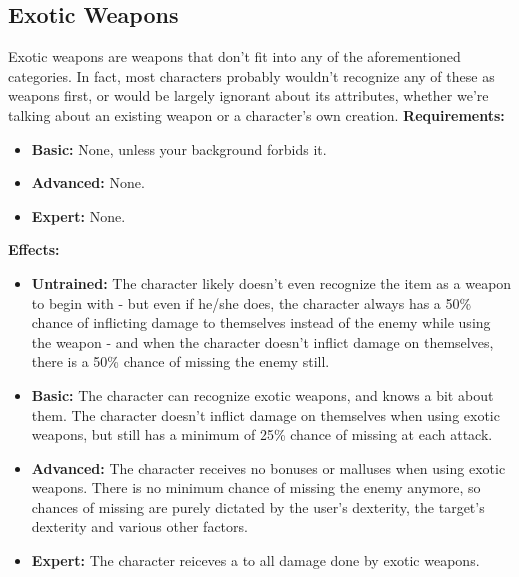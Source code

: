 \documentclass[openany,10pt,a4paper]{book}
\begin{document}
\subsection{Exotic Weapons}
\begin{table}[!ht]
\centering
{}
\end{table}
Exotic weapons are weapons that don't fit into any of the aforementioned categories. In fact, most characters probably wouldn't recognize any of these as weapons first, or would be largely ignorant about its attributes, whether we're talking about an existing weapon or a character's own creation.
\textbf{Requirements:}
\begin{itemize}
	\item \textbf{Basic:} None, unless your background forbids it.
	\item \textbf{Advanced:} None.
	\item \textbf{Expert:} None.
\end{itemize}
\textbf{Effects:}
\begin{itemize}
	\item \textbf{Untrained:} The character likely doesn't even recognize the item as a weapon to begin with - but even if he/she does, the character always has a 50\% chance of inflicting damage to themselves instead of the enemy while using the weapon - and when the character doesn't inflict damage on themselves, there is a 50\% chance of missing the enemy still.
	\item \textbf{Basic:} The character can recognize exotic weapons, and knows a bit about them. The character doesn't inflict damage on themselves when using exotic weapons, but still has a minimum of 25\% chance of missing at each attack.
	\item \textbf{Advanced:} The character receives no bonuses or malluses when using exotic weapons. There is no minimum chance of missing the enemy anymore, so chances of missing are purely dictated by the user's dexterity, the target's dexterity and various other factors.
	\item \textbf{Expert:} The character reiceves a  to all damage done by exotic weapons.
\end{itemize}\newpage
\end{document}
